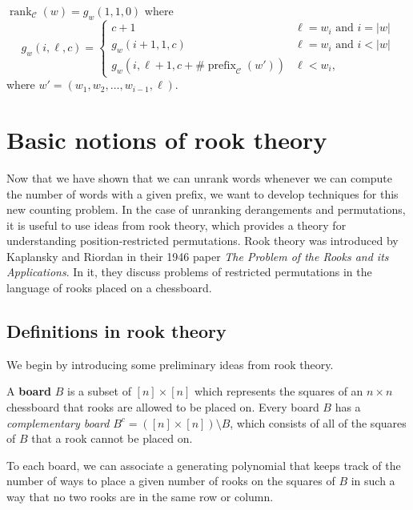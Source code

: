 \begin{claim}
  ${\operatorname{rank}_\mathcal{C}(w) = g_w(1,1,0)}$ where
  \begin{equation}
    g_w(i, \ell, c) = \begin{cases}
      c + 1 & \ell = w_i \text{ and } i = |w| \\
      g_w(i + 1, 1, c) & \ell = w_i \text{ and } i < |w| \\
      g_w(i, \ell + 1, c + \#\operatorname{prefix}_\mathcal{C}(w')) & \ell < w_i,
    \end{cases}
  \end{equation}
  where $w' = (w_1, w_2, \dots, w_{i-1}, \ell)$.
\end{claim}

\section{Basic notions of rook theory}
Now that we have shown that we can unrank words whenever we can compute the
number of words with a given prefix, we want to develop techniques for this new
counting problem.
In the case of unranking derangements and permutations, it is useful to use
ideas from rook theory, which provides a theory for understanding
position-restricted permutations.
Rook theory was introduced by Kaplansky and Riordan \cite{Kaplansky1946}
in their 1946 paper \textit{The Problem of the Rooks and its Applications}. In
it, they discuss problems of restricted permutations in the language of rooks
placed on a chessboard.



\subsection{Definitions in rook theory}
We begin by introducing some preliminary ideas from rook theory.

\begin{definition}
  A \textbf{board} $B$ is a subset of $[n] \times [n]$ which represents the
  squares of an $n \times n$ chessboard that rooks are allowed to be placed on.
  Every board $B$ has a \textit{complementary board}
  $B^c = ([n] \times [n]) \setminus B$, which consists of all of the
  squares of $B$ that a rook cannot be placed on.
\end{definition}

To each board, we can associate a generating polynomial that keeps track of the
number of ways to place a given number of rooks on the squares of $B$ in such a
way that no two rooks are in the same row or column.

